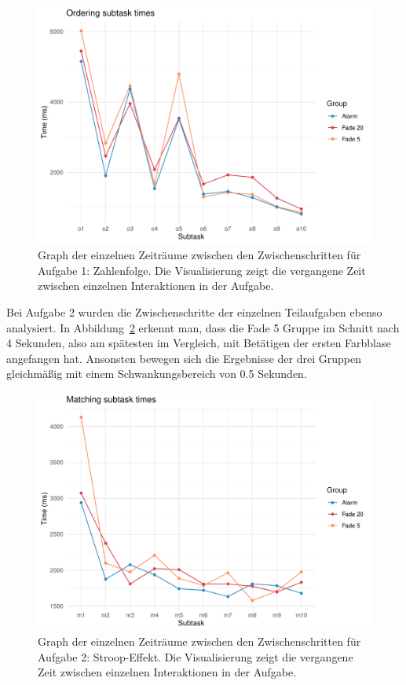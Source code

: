 \begin{figure}[H]
	\centering
	\includegraphics[width=\textwidth]{./_StudyResults/timeTask1}
	\caption{Graph der einzelnen Zeiträume zwischen den Zwischenschritten für Aufgabe 1: Zahlenfolge. Die Visualisierung zeigt die vergangene Zeit zwischen einzelnen Interaktionen in der Aufgabe.}
	\label{fig:timeTask1}
\end{figure}

Bei Aufgabe 2 wurden die Zwischenschritte der einzelnen Teilaufgaben ebenso analysiert. In Abbildung~\ref{fig:timeTask2} erkennt man, dass die Fade 5 Gruppe im Schnitt nach 4 Sekunden, also am spätesten im Vergleich, mit Betätigen der ersten Farbblase angefangen hat. Ansonsten bewegen sich die Ergebnisse der drei Gruppen gleichmäßig mit einem Schwankungsbereich von 0.5 Sekunden.

\begin{figure}[H]
	\centering
	\includegraphics[width=\textwidth]{./_StudyResults/timeTask2}
	\caption{Graph der einzelnen Zeiträume zwischen den Zwischenschritten für Aufgabe 2: Stroop-Effekt. Die Visualisierung zeigt die vergangene Zeit zwischen einzelnen Interaktionen in der Aufgabe.}
	\label{fig:timeTask2}
\end{figure}

